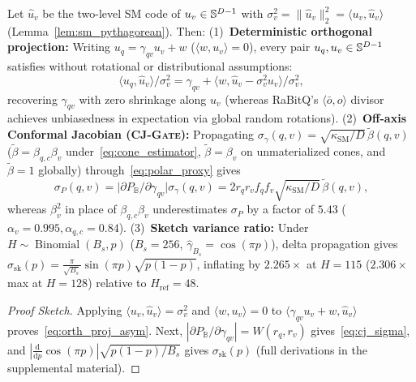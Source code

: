 \begin{proposition}
\label{prop:asym_cj_gate}
Let $\hat{u}_v$ be the two-level {SM} code of $u_v \in \mathbb{S}^{D-1}$ with $\sigma_v^2 = \|\hat{u}_v\|_2^2 = \langle u_v, \hat{u}_v\rangle$ (Lemma~\ref{lem:sm_pythagorean}). Then:
(1)~\textbf{Deterministic orthogonal projection:} Writing $u_q = \gamma_{qv} u_v + w$ ($\langle w, u_v\rangle = 0$), every pair $u_q, u_v \in \mathbb{S}^{D-1}$ satisfies without rotational or distributional assumptions:
\begin{equation}
  \langle u_q, \hat{u}_v\rangle / \sigma_v^2 = \gamma_{qv} + \langle w, \hat{u}_v - \sigma_v^2 u_v\rangle / \sigma_v^2,
  \label{eq:orth_proj_asym}
\end{equation}
recovering $\gamma_{qv}$ with zero shrinkage along $u_v$ (whereas {RaBitQ}'s $\langle \bar{o}, o\rangle$ divisor~\cite{gao2024rabitq} achieves unbiasedness in expectation via global random rotations).
(2)~\textbf{Off-axis Conformal Jacobian (\textsc{CJ-Gate}):} Propagating $\sigma_\gamma(q, v) = \sqrt{\kappa_{\mathrm{SM}}/D}\,\tilde{\beta}(q, v)$ ($\tilde{\beta} = \beta_{q,c}\beta_v$ under~\eqref{eq:cone_estimator}, $\tilde{\beta} = \beta_v$ on unmaterialized cones, and $\tilde{\beta} = 1$ globally) through~\eqref{eq:polar_proxy} gives
\begin{equation}
  \sigma_P(q, v) = \bigl|\partial P_{\mathbb{B}} / \partial \gamma_{qv}\bigr|\sigma_\gamma(q, v) = 2 r_q r_v f_q f_v \sqrt{\kappa_{\mathrm{SM}}/D}\,\tilde{\beta}(q, v),
  \label{eq:cj_sigma}
\end{equation}
whereas $\beta_v^2$ in place of $\beta_{q,c}\beta_v$ underestimates $\sigma_P$ by a factor of $5.43$ ($\alpha_v = 0.995, \alpha_{q,c} = 0.84$).
(3)~\textbf{Sketch variance ratio:} Under $H \sim \operatorname{Binomial}(B_s, p)$ ($B_s = 256$, $\hat{\gamma}_{B_s} = \cos(\pi p)$), delta propagation gives $\sigma_{\mathrm{sk}}(p) = \frac{\pi}{\sqrt{B_s}}\sin(\pi p)\sqrt{p(1 - p)}$, inflating by $2.265\times$ at $H = 115$ ($2.306\times$ max at $H = 128$) relative to $H_{\mathrm{ref}} = 48$.
\end{proposition}
\begin{proof}[Proof Sketch]
Applying $\langle u_v, \hat{u}_v\rangle = \sigma_v^2$ and $\langle w, u_v\rangle = 0$ to $\langle \gamma_{qv} u_v + w, \hat{u}_v\rangle$ proves~\eqref{eq:orth_proj_asym}. Next, $|\partial P_{\mathbb{B}}/\partial \gamma_{qv}| = W(r_q, r_v)$ gives~\eqref{eq:cj_sigma}, and $|\frac{\mathrm{d}}{\mathrm{d}p}\cos(\pi p)|\sqrt{p(1-p)/B_s}$ gives $\sigma_{\mathrm{sk}}(p)$ (full derivations in the supplemental material).
\end{proof}

